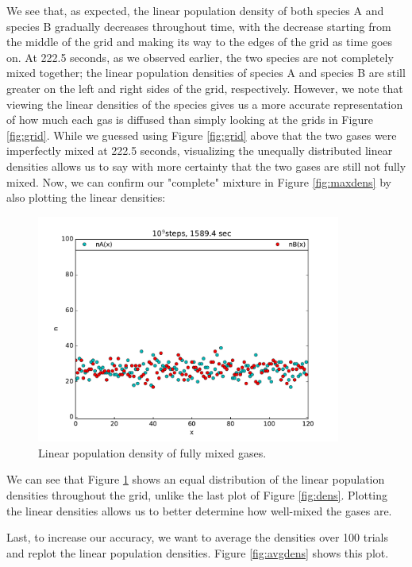 \documentclass{article}
\begin{document}
\noindent We see that, as expected, the linear population density of both species A and species B gradually decreases throughout time, with the decrease starting from the middle of the grid and making its way to the edges of the grid as time goes on. At 222.5 seconds, as we observed earlier, the two species are not completely mixed together; the linear population densities of species A and species B are still greater on the left and right sides of the grid, respectively. However, we note that viewing the linear densities of the species gives us a more accurate representation of how much each gas is diffused than simply looking at the grids in Figure \ref{fig:grid}. While we guessed using Figure \ref{fig:grid} above that the two gases were imperfectly mixed at 222.5 seconds, visualizing the unequally distributed linear densities allows us to say with more certainty that the two gases are still not fully mixed. Now, we can confirm our "complete" mixture in Figure \ref{fig:maxdens} by also plotting the linear densities:\par

\begin{figure}[H]
\centering
\includegraphics[width=10cm]{GP1_3_maxlimit_density.pdf}
\caption{Linear population density of fully mixed gases.}
\label{fig:maxdensplot}
\end{figure}

\noindent We can see that Figure \ref{fig:maxdensplot} shows an equal distribution of the linear population densities throughout the grid, unlike the last plot of Figure \ref{fig:dens}. Plotting the linear densities allows us to better determine how well-mixed the gases are.\par

Last, to increase our accuracy, we want to average the densities over 100 trials and replot the linear population densities. Figure \ref{fig:avgdens} shows this plot.\par
\end{document}
